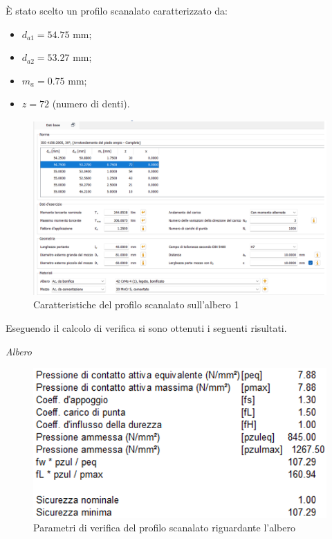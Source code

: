 È stato scelto un profilo scanalato caratterizzato da:
\begin{itemize}
    \item $d_{a1}=54.75$ mm;
    \item $d_{a2}=53.27$ mm;
    \item $m_a=0.75$ mm;
    \item $z=72$ (numero di denti).
\end{itemize}
\newpage
\begin{figure}[h]
    \centering
    \includegraphics[scale=0.5]{Immagini/Scanalato1.png}
    \caption{Caratteristiche del profilo scanalato sull'albero 1}
    \label{fig:Scanalato1}
\end{figure}

Eseguendo il calcolo di verifica si sono ottenuti i seguenti risultati.

\emph{Albero}
\begin{figure}[h]
    \centering
    \includegraphics[scale=0.5]{Immagini/RisultatiScanalatoAlbero1.png}
    \caption{Parametri  di verifica del profilo scanalato riguardante l'albero}
    \label{fig:RisultatiScanalatoAlbero1}
\end{figure}

